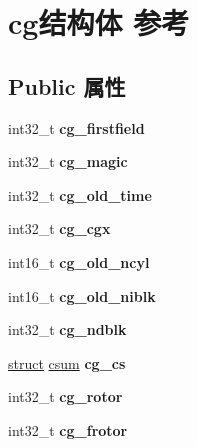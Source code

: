 \hypertarget{structcg}{}\section{cg结构体 参考}
\label{structcg}
\subsection*{Public 属性}
\begin{DoxyCompactItemize}
\item 
\mbox{\label{structcg_a1549459c3334b515b7d603e7761d7c89}} 
int32\+\_\+t {\bfseries cg\+\_\+firstfield}
\item 
\mbox{\label{structcg_a6629382df74fc53d4cd75335ac356c4f}} 
int32\+\_\+t {\bfseries cg\+\_\+magic}
\item 
\mbox{\label{structcg_a1bdeaf16858c154be8aa5104a924751c}} 
int32\+\_\+t {\bfseries cg\+\_\+old\+\_\+time}
\item 
\mbox{\label{structcg_ae724a13c088db68822e4a9c1b77bb8da}} 
int32\+\_\+t {\bfseries cg\+\_\+cgx}
\item 
\mbox{\label{structcg_af44e6cc32447721638515ce1a8038eed}} 
int16\+\_\+t {\bfseries cg\+\_\+old\+\_\+ncyl}
\item 
\mbox{\label{structcg_ad40cea978c5330c511d7d4d2b2de7d76}} 
int16\+\_\+t {\bfseries cg\+\_\+old\+\_\+niblk}
\item 
\mbox{\label{structcg_ad00b03a4409f3f531cb450a440bc23ba}} 
int32\+\_\+t {\bfseries cg\+\_\+ndblk}
\item 
\mbox{\label{structcg_a352e2d3f82fbc0d04146d5b81a4c8883}} 
\hyperlink{interfacestruct}{struct} \hyperlink{structcsum}{csum} {\bfseries cg\+\_\+cs}
\item 
\mbox{\label{structcg_ae1e9a9b6170af489ee4b0ab0ad89f5dd}} 
int32\+\_\+t {\bfseries cg\+\_\+rotor}
\item 
\mbox{\label{structcg_a7e2c9202515f53e2de070eb8bcdb02ab}} 
int32\+\_\+t {\bfseries cg\+\_\+frotor}
\item 

\end{DoxyCompactItemize}
